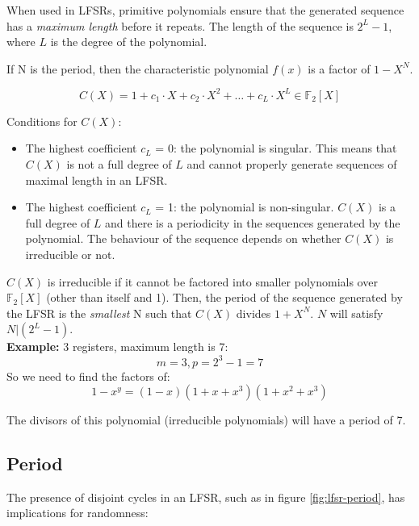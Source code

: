 When used in LFSRs, primitive polynomials ensure that the generated sequence has a \emph{maximum length} before it repeats. The length of the sequence is $2^L -1$, where $L$ is the degree of the polynomial.

\begin{thm}
    If N is the period, then the characteristic polynomial $f(x)$ is a factor of $1-X^N$. 
\end{thm}


\[ C(X) = 1 + c_1 \cdot X + c_2 \cdot X^2 + \dots + c_L \cdot X^L \in \mathbb{F}_2\left[X \right] \]

Conditions for $C(X)$:
\begin{itemize}
    \item The highest coefficient $c_L$ = 0: the polynomial is singular. This means that $C(X)$ is not a full degree of $L$ and cannot properly generate sequences of maximal length in an LFSR.
    \item The highest coefficient $c_L$ = 1: the polynomial is non-singular. $C(X)$ is a full degree of $L$ and there is a periodicity in the sequences generated by the polynomial. The behaviour of the sequence depends on whether $C(X)$ is irreducible or not.
\end{itemize}

$C(X)$ is irreducible if it cannot be factored into smaller polynomials over $\mathbb{F}_2\left[X \right]$ (other than itself and 1).
Then, the period of the sequence generated by the LFSR is the \emph{smallest} N such that $C(X)$ divides $1 + X^N$.
$N$ will satisfy $N | (2^L-1)$. \\

\textbf{Example:}
3 registers, maximum length is 7:
\[m = 3, p = 2^3 -1 = 7\] 
So we need to find the factors of:
\[1 - x^y = (1-x)(1 + x + x^3)(1 + x^2 + x^3)\]

The divisors of this polynomial (irreducible polynomials) will have a period of 7.

\subsection{Period}

The presence of disjoint cycles in an LFSR, such as in figure \ref{fig:lfsr-period}, has implications for randomness:

